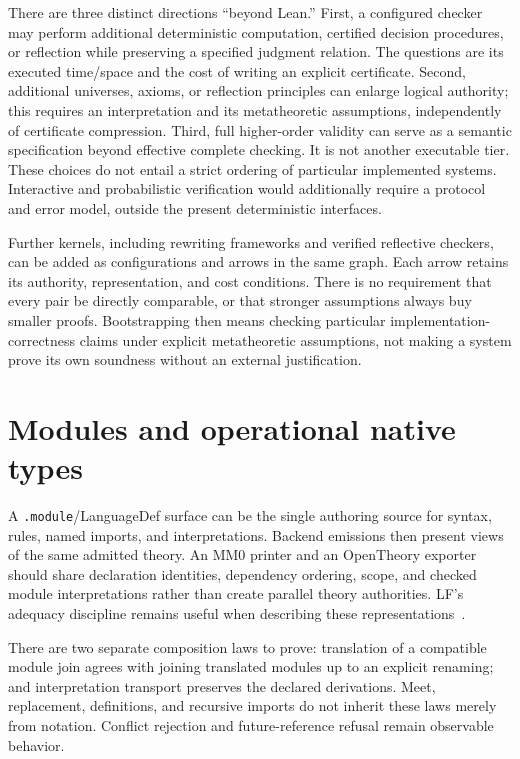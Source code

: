 \documentclass[11pt]{article}
\newcommand{\code}[1]{\nolinkurl{#1}}
\begin{document}
There are three distinct directions ``beyond Lean.'' First, a configured
checker may perform additional deterministic computation, certified decision
procedures, or reflection while preserving a specified judgment relation.
The questions are its executed time/space and the cost of writing an explicit
certificate. Second, additional universes, axioms, or reflection principles
can enlarge logical authority; this requires an interpretation and its
metatheoretic assumptions, independently of certificate compression. Third,
full higher-order validity can serve as a semantic specification beyond
effective complete checking. It is not another executable tier. These
choices do not entail a strict ordering of particular implemented systems.
Interactive and probabilistic verification would additionally require a
protocol and error model, outside the present deterministic interfaces.

Further kernels, including rewriting frameworks and verified reflective
checkers, can be added as configurations and arrows in the same graph.
Each arrow retains its authority, representation, and cost conditions.
There is no requirement that every pair be directly comparable, or that
stronger assumptions always buy smaller proofs. Bootstrapping then means
checking particular implementation-correctness claims under explicit
metatheoretic assumptions, not making a system prove its own soundness
without an external justification.

\section{Modules and operational native types}
A \code{.module}/LanguageDef surface can be the single authoring source
for syntax, rules, named imports, and interpretations. Backend emissions
then present views of the same admitted theory. An MM0 printer and an
OpenTheory exporter should share declaration identities, dependency
ordering, scope, and checked module interpretations rather than create
parallel theory authorities. LF's adequacy discipline remains useful
when describing these representations~\cite{lf}.

There are two separate composition laws to prove: translation of a
compatible module join agrees with joining translated modules up to an
explicit renaming; and interpretation transport preserves the declared
derivations. Meet, replacement, definitions, and recursive imports do
not inherit these laws merely from notation. Conflict rejection and
future-reference refusal remain observable behavior.
\end{document}
